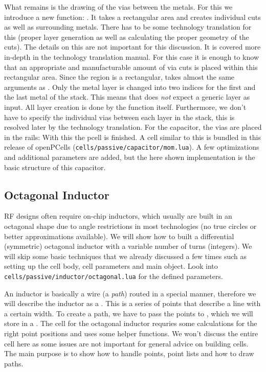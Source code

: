 What remains is the drawing of the vias between the metals.
For this we introduce a new  function: .
It takes a rectangular area and creates individual cuts as well as surrounding metals.
There has to be some technology translation for this (proper layer generation as well as calculating the proper geometry of the cuts).
The details on this are not important for this discussion.
It is covered more in-depth in the technology translation manual.
For this case it is enough to know that an appropriate and manufacturable amount of via cuts is placed within this rectangular area.
Since the region is a rectangular,  takes almost the same arguments as .
Only the metal layer is changed into two indices for the first and the last metal of the stack.
This means that  does \emph{not} expect a generic layer as input.
All layer creation is done by the function itself.
Furthermore, we don't have to specify the individual vias between each layer in the stack, this is resolved later by the technology translation.
For the capacitor, the vias are placed in the rails:
With this the pcell is finished.
A cell similar to this is bundled in this release of openPCells (\texttt{cells/passive/capacitor/mom.lua}).
A few optimizations and additional parameters are added, but the here shown implementation is the basic structure of this capacitor.

\subsection{Octagonal Inductor}
RF designs often require on-chip inductors, which usually are built in an octagonal shape due to angle restrictions in most technologies (no true circles or
better approximations available).
We will show how to built a differential (symmetric) octagonal inductor with a variable number of turns (integers).
We will skip some basic techniques that we already discussed a few times such as setting up the cell body, cell parameters and main object.
Look into \texttt{cells/passive/inductor/octagonal.lua} for the defined parameters.

An inductor is basically a wire (a \emph{path}) routed in a special manner, therefore we will describe the inductor as a .
This is a series of points that describe a line with a certain width.
To create a path, we have to pass the points to , which we will store in a .
The cell for the octagonal inductor requries some calculations for the right point positions and uses some helper functions.
We won't discuss the entire cell here as some issues are not important for general advice on building cells.
The main purpose is to show how to handle points, point lists and how to draw paths.


